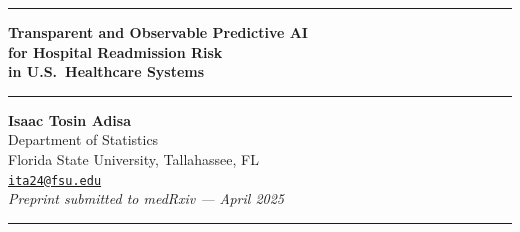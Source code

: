 \documentclass[11pt,letterpaper]{article}
\begin{document}

\begin{center}

{\color{niw-blue}\rule{\linewidth}{2pt}}
\vspace{0.6em}

{\LARGE\bfseries\color{niw-blue}
Transparent and Observable Predictive AI\\[0.3em]
for Hospital Readmission Risk\\[0.3em]
in U.S.\ Healthcare Systems}

\vspace{0.8em}
{\color{niw-blue}\rule{\linewidth}{0.6pt}}
\vspace{0.6em}

{\large \textbf{Isaac Tosin Adisa}}\\[0.2em]
{\normalsize Department of Statistics}\\
{\normalsize Florida State University, Tallahassee, FL}\\[0.2em]
{\normalsize \href{mailto:ita24@fsu.edu}{\texttt{ita24@fsu.edu}}}\\[0.2em]
{\small \textit{Preprint submitted to medRxiv --- April 2025}}

\vspace{0.4em}
{\color{niw-blue}\rule{\linewidth}{2pt}}
\end{center}

\vspace{0.5em}
\end{document}
